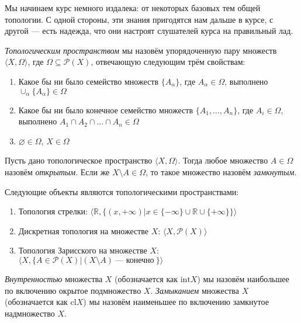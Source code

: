 Мы начинаем курс немного издалека: от некоторых базовых тем общей топологии.
С одной стороны, эти знания пригодятся нам дальше в курсе, с другой --- есть 
надежда, что они настроят слушателей курса на правильный лад.

\begin{definition} \emph{Топологическим пространством} мы назовём упорядоченную
пару множеств $\langle X, \Omega \rangle$, где $\Omega \subseteq {\mathcal{P}}(X)$,
отвечающую следующим трём свойствам:

\begin{enumerate}
\item Какое бы ни было семейство множеств $\{A_\alpha\}$, где $A_\alpha \in \Omega$, выполнено
$\cup_\alpha\{A_\alpha\} \in \Omega$
\item Какое бы ни было конечное семейство множеств $\{A_1, \dots, A_n\}$, где $A_i \in \Omega$,
выполнено $A_1 \cap A_2 \cap \dots \cap A_n \in \Omega$
\item $\varnothing \in \Omega$, $X \in \Omega$
\end{enumerate}
\end{definition}

\begin{definition} Пусть дано топологическое пространство $\langle X, \Omega \rangle$.
Тогда любое множество $A \in \Omega$ назовём \emph{открытым}. Если же $X \setminus A \in \Omega$, 
то такое множество назовём \emph{замкнутым}.
\end{definition}

\begin{theorem} Следующие объекты являются топологическими пространствами:
\begin{enumerate}
\item Топология стрелки: $\langle \mathbb{R}, \{(x,+\infty) | x \in \{-\infty\}\cup\mathbb{R}\cup\{+\infty\}\} \rangle$
\item Дискретная топология на множестве $X$: $\langle X, {\mathcal{P}}(X) \rangle$
\item Топология Зарисского на множестве $X$: $\langle X, \{ A \in {\mathcal{P}}(X) | (X \setminus A) ~\textrm{--- конечно}~\} \rangle$
\end{enumerate}
\end{theorem}

\begin{definition}
\emph{Внутренностью} множества $X$ (обозначается как $\mathrm{int} X$) мы назовём наибольшее по включению окрытое подмножество $X$.
\emph{Замыканием} множества $X$ (обозначается как $\mathrm{cl} X$) мы назовём наименьшее по включению замкнутое надмножество $X$.
\end{definition}

